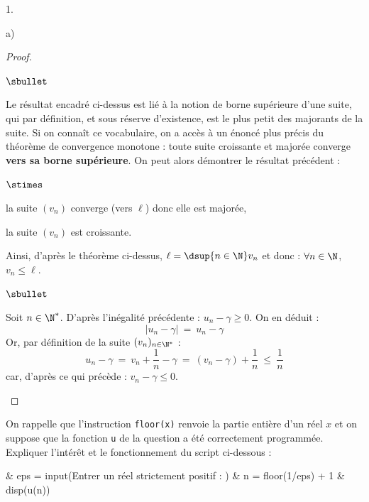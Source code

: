 \begin{noliste}{1.}
\begin{noliste}{a)}
\begin{proof}
\begin{remark}
\begin{noliste}{$\sbullet$}
          \item Le résultat encadré ci-dessus est lié à la notion de
            borne supérieure d'une suite, qui par définition, et sous
            réserve d'existence, est le plus petit des majorants de la
            suite. Si on connaît ce vocabulaire, on a accès à un
            énoncé plus précis du théorème de convergence monotone :
            toute suite croissante et majorée converge {\bf vers sa
              borne supérieure}. On peut alors démontrer le résultat
            précédent :
            \begin{noliste}{$\stimes$}
            \item la suite $(v_n)$ converge (vers $\ell$) donc elle
              est majorée,
            \item la suite $(v_n)$ est croissante.
            \end{noliste}
            Ainsi, d'après le théorème ci-dessus, $\ell = \dsup{n \in
              \N} v_n$ et donc : $\forall n \in \N$, $v_n \leq \ell$.
          \end{noliste}

        \end{remark}

        \begin{noliste}{$\sbullet$}
      \item Soit $n \in \N^*$. D'après l'inégalité précédente : $u_n -
        \gamma \geq 0$. On en déduit :
        \[
        \big| u_n - \gamma \big| \ = \ u_n - \gamma
        \]
        Or, par définition de la suite $(v_n)_{n \in \N^*}$ :
        \[
        u_n - \gamma \ = \ v_n + \dfrac{1}{n} - \gamma \ = \ \left(v_n
          - \gamma \right) + \dfrac{1}{n} \ \leq \ \dfrac{1}{n}
        \]
        car, d'après ce qui précède : $v_n - \gamma \leq 0$.%
        ~\\[-1.4cm]
      \end{noliste}
    \end{proof}

  \item On rappelle que l'instruction {\tt floor(x)} renvoie la partie
    entière d'un réel $x$ et on suppose que la fonction {\tt u} de la
    question \itbf{1.e)} a été correctement programmée. Expliquer
    l'intérêt et le fonctionnement du script ci-dessous :
    \begin{scilab}
      & eps = input(\ttq{}Entrer un réel strictement positif : \ttq{})
      \nl %
      & n = floor(1/eps) + 1 \nl %
      & disp(u(n))
    \end{scilab}


\end{noliste}
\end{noliste}
